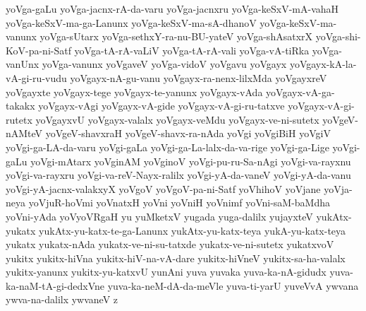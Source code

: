 {yoVga-gaLu
yoVga-jacnx-rA-da-varu
yoVga-jacnxru
yoVga-keSxV-mA-vahaH
yoVga-keSxV-ma-ga-Lanunx
yoVga-keSxV-ma-sA-dhanoV
yoVga-keSxV-ma-vanunx
yoVga-sUtarx
yoVga-sethxY-ra-nu-BU-yateV
yoVga-shAsatxrX
yoVga-shi-KoV-pa-ni-Satf
yoVga-tA-rA-vaLiV
yoVga-tA-rA-vali
yoVga-vA-tiRka
yoVga-vanUnx
yoVga-vanunx
yoVgaveV
yoVga-vidoV
yoVgavu
yoVgayx
yoVgayx-kA-la-vA-gi-ru-vudu
yoVgayx-nA-gu-vanu
yoVgayx-ra-nenx-lilxMda
yoVgayxreV
yoVgayxte
yoVgayx-tege
yoVgayx-te-yanunx
yoVgayx-vAda
yoVgayx-vA-ga-takakx
yoVgayx-vAgi
yoVgayx-vA-gide
yoVgayx-vA-gi-ru-tatxve
yoVgayx-vA-gi-rutetx
yoVgayxvU
yoVgayx-valalx
yoVgayx-veMdu
yoVgayx-ve-ni-sutetx
yoVgeV-nAMteV
yoVgeV-shavxraH
yoVgeV-shavx-ra-nAda
yoVgi
yoVgiBiH
yoVgiV
yoVgi-ga-LA-da-varu
yoVgi-gaLa
yoVgi-ga-La-lalx-da-va-rige
yoVgi-ga-Lige
yoVgi-gaLu
yoVgi-mAtarx
yoVginAM
yoVginoV
yoVgi-pu-ru-Sa-nAgi
yoVgi-va-rayxnu
yoVgi-va-rayxru
yoVgi-va-reV-Nayx-ralilx
yoVgi-yA-da-vaneV
yoVgi-yA-da-vanu
yoVgi-yA-jacnx-valakxyX
yoVgoV
yoVgoV-pa-ni-Satf
yoVhihoV
yoVjane
yoVja-neya
yoVjuR-hoVmi
yoVnatxH
yoVni
yoVniH
yoVnimf
yoVni-saM-baMdha
yoVni-yAda
yoVyoVRgaH
yu
yuMketxV
yugada
yuga-dalilx
yujayxteV
yukAtx-yukatx
yukAtx-yu-katx-te-ga-Lanunx
yukAtx-yu-katx-teya
yukA-yu-katx-teya
yukatx
yukatx-nAda
yukatx-ve-ni-su-tatxde
yukatx-ve-ni-sutetx
yukatxvoV
yukitx
yukitx-hiVna
yukitx-hiV-na-vA-dare
yukitx-hiVneV
yukitx-sa-ha-valalx
yukitx-yanunx
yukitx-yu-katxvU
yunAni
yuva
yuvaka
yuva-ka-nA-gidudx
yuva-ka-naM-tA-gi-dedxVne
yuva-ka-neM-dA-da-meVle
yuva-ti-yarU
yuveVvA
ywvana
ywva-na-dalilx
ywvaneV
z
}
